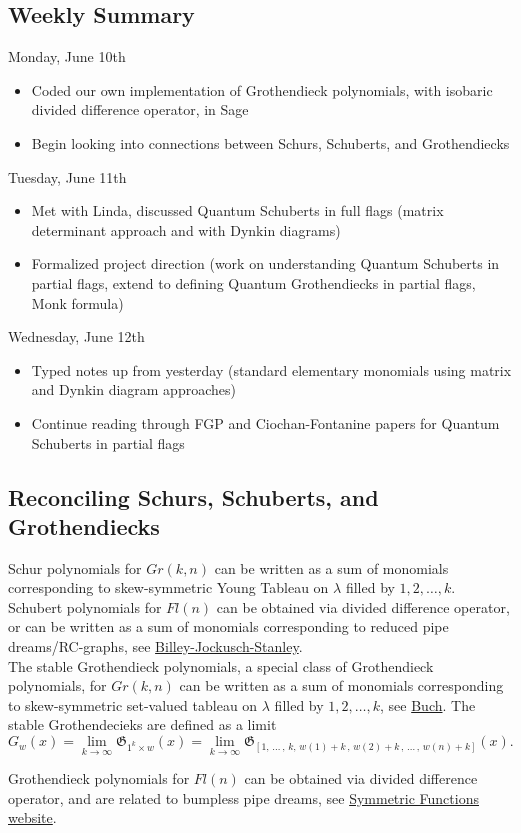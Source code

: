 \subsection{Weekly Summary}

Monday, June 10th
\begin{itemize}
    \item Coded our own implementation of Grothendieck polynomials, with isobaric divided difference operator, in Sage
    \item Begin looking into connections between Schurs, Schuberts, and Grothendiecks
\end{itemize}

Tuesday, June 11th
\begin{itemize}
    \item Met with Linda, discussed Quantum Schuberts in full flags (matrix determinant approach and with Dynkin diagrams)
    \item Formalized project direction (work on understanding Quantum Schuberts in partial flags, extend to defining Quantum Grothendiecks in partial flags, Monk formula)
\end{itemize}

Wednesday, June 12th
\begin{itemize}
    \item Typed notes up from yesterday (standard elementary monomials using matrix and Dynkin diagram approaches)
    \item Continue reading through FGP and Ciochan-Fontanine papers for Quantum Schuberts in partial flags
\end{itemize}

\subsection{Reconciling Schurs, Schuberts, and Grothendiecks}

Schur polynomials for $Gr(k,n)$ can be written as a sum of monomials corresponding to skew-symmetric Young Tableau on $\lambda$ filled by $1, 2, \dots, k$. \\

Schubert polynomials for $Fl(n)$ can be obtained via divided difference operator, or can be written as a sum of monomials corresponding to reduced pipe dreams/RC-graphs, see \href{https://sites.math.washington.edu/~billey/papers/bjs.pdf}{Billey-Jockusch-Stanley}. \\

The stable Grothendieck polynomials, a special class of Grothendieck polynomials, for $Gr(k,n)$ can be written as a sum of monomials corresponding to skew-symmetric set-valued tableau on $\lambda$ filled by $1, 2, \dots, k$, see 
\href{https://sites.math.rutgers.edu/~asbuch/papers/combkth.pdf}{Buch}. The stable Grothendecieks are defined as a limit
\[ 
    G_w(x) = \lim\limits_{k \rightarrow \infty}\mathfrak{G}_{1^k \times w}(x) = \lim\limits_{k \rightarrow \infty}\mathfrak{G}_{[1, \, \dots \,, \, k, \, w(1) + k \,, \,w(2) + k \,, \, \dots \,, \,w(n)+ k]}(x).
\]

Grothendieck polynomials for $Fl(n)$ can be obtained via divided difference operator, and are related to bumpless pipe dreams, see \href{https://www.symmetricfunctions.com/grothendieck.htm}{Symmetric Functions website}.
